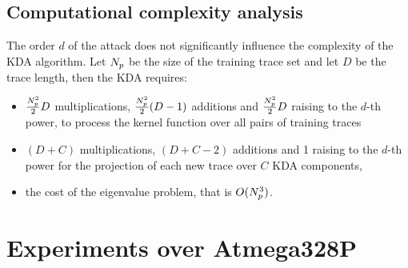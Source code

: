 \subsection{Computational complexity analysis}
The order $d$ of the attack does not significantly influence the complexity of the KDA algorithm. Let $N_p$ be the size of the training trace set and let $D$ be the trace length, then the KDA requires:
\begin{itemize}
\item $\frac{N_p^2}{2}D$ multiplications, $\frac{N_p^2}{2}(D-1)$ additions and $\frac{N_p^2}{2}D$ raising to the $d$-th power, to process the kernel function over all pairs of training traces
\item $(D+C)$ multiplications, $(D+C-2)$ additions and 1 raising to the $d$-th power for the projection of each new trace over $C$ KDA components,
\item the cost of the eigenvalue problem, that is $O(N_p^3)$.
\end{itemize} 


\section{Experiments over Atmega328P}
